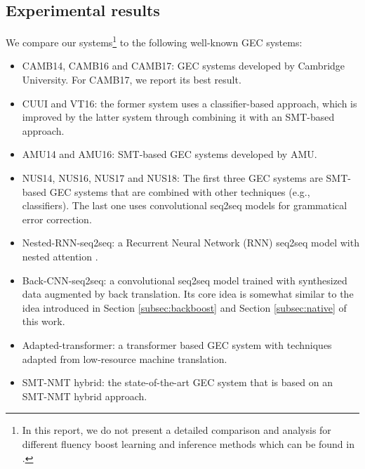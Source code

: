 \documentclass{article} %
\begin{document}
\subsection{Experimental results}

We compare our systems\footnote{In this report, we do not present a detailed comparison and analysis for different fluency boost learning and inference methods which can be found in \cite{ge2018fluency}.} to the following well-known GEC systems:

\leftmargini=5mm
\begin{itemize}

\item CAMB14, CAMB16 and CAMB17: GEC systems \citep{felice2014grammatical,yuan2016grammatical,yannakoudakis2017neural} developed by Cambridge University. For CAMB17, we report its best result.
\item CUUI and VT16: the former system \citep{rozovskaya2014illinois} uses a classifier-based approach, which is improved by the latter system \citep{rozovskaya2016grammatical} through combining it with an SMT-based approach.
\item AMU14 and AMU16: SMT-based GEC systems \citep{junczys2014amu,junczys2016phrase} developed by AMU.
\item NUS14, NUS16, NUS17 and NUS18: The first three GEC systems \citep{Susanto2014System,chollampatt2016adapting,chollampatt-ng:2017:BEA} are SMT-based GEC systems that are combined with other techniques (e.g., classifiers). The last one \citep{chollampatt2018} uses convolutional seq2seq models for grammatical error correction.
\item Nested-RNN-seq2seq: a Recurrent Neural Network (RNN) seq2seq model with nested attention \citep{ji2017nested}.
\item Back-CNN-seq2seq: a convolutional seq2seq model \citep{xie2018noising} trained with synthesized data augmented by back translation. Its core idea is somewhat similar to the idea introduced in Section \ref{subsec:backboost} and Section \ref{subsec:native} of this work.
\item Adapted-transformer: a transformer \citep{vaswani2017attention} based GEC system \citep{junczys2018approaching} with techniques adapted from low-resource machine translation.
\item SMT-NMT hybrid: the state-of-the-art GEC system \citep{grundkiewicz2018near} that is based on an SMT-NMT hybrid approach.
\end{itemize}
\end{document}
